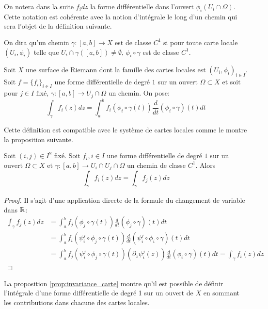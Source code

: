 \begin{rem}
On notera dans la suite $f_i dz$ la forme différentielle dans l'ouvert $\phi_i(U_i\cap \Omega)$. Cette notation est cohérente avec la notion d'intégrale le long d'un chemin qui sera l'objet de la définition suivante. 
\end{rem}
On dira qu'un chemin $\gamma \colon [a,b] \to X$ est de classe $C^1$ si pour toute carte locale $(U_i,\phi_i)$ telle que $U_i \cap \gamma([a,b]) \neq \emptyset$, $\phi_i \circ \gamma$ est de classe $C^1$.
\begin{defn}
\label{def:integrale_chemin_riemann}
Soit $X$ une surface de Riemann dont la famille des cartes locales est $(U_i,\phi_i)_{i \in I}$. Soit $f = \{f_i\}_{i \in I}$ une forme différentielle de degré $1$ sur un ouvert $\Omega \subset X$ et soit pour $j \in I$ fixé, $\gamma \colon [a,b] \to U_j \cap \Omega$ un chemin. On pose:
\[
\int_{\gamma} f_i(z) dz = \int_a^b f_i\left(\phi_i\circ \gamma(t)\right)\frac{d}{dt}\left(\phi_i\circ \gamma\right)(t) dt
\]
\end{defn}
Cette définition est compatible avec le système de cartes locales comme le montre la proposition suivante.
\begin{prop}
\label{prop:invariance_carte}
Soit $(i,j) \in I^2$ fixé. Soit $f_i, i \in I$ une forme différentielle de degré $1$ sur un ouvert $\Omega \subset X$ et $\gamma \colon [a,b] \to U_i \cap U_j \cap \Omega$ un chemin de classe $C^1$. Alors
\[
\int_\gamma f_i(z) dz = \int_\gamma f_j(z) dz
\]
\end{prop}
\begin{proof}
Il s'agit d'une application directe de la formule du changement de variable dans $\mathbb R$:
\[
\begin{split}
 \int_{\gamma} f_j(z) dz & = \int_a^b f_j\left(\phi_j\circ \gamma(t)\right)\frac{d}{dt}\left(\phi_j\circ \gamma\right)(t) dt  \\
& = \int_a^b f_i\left(\psi_i^j\circ \phi_j\circ \gamma(t)\right)\frac{d}{dt}\left(\psi_i^j\circ \phi_i\circ \gamma\right)(t) dt  \\
& = \int_a^b f_j\left(\psi_i^j \circ \phi_j\circ \gamma(t)\right)(\partial_z\psi_i^j(z))\frac{d}{dt} \left(\phi_i\circ \gamma\right)(t) dt  =\int_{\gamma} f_i(z) dz
\end{split}
\]
\end{proof}
La proposition \ref{prop:invariance_carte} montre qu'il est possible de définir l'intégrale d'une forme différentielle de degré 1 sur un ouvert de $X$ en sommant les contributions dans chacune des cartes locales. 
